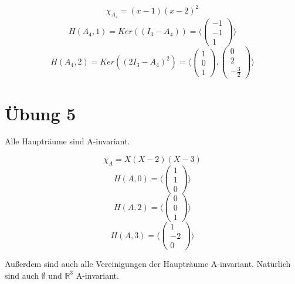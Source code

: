 \documentclass[10pt,a4paper]{article}
\begin{document}
\begin{equation}
\chi_{A_{4}} = (x - 1)(x - 2)^{2}
\end{equation}
\begin{equation}
H(A_{4}, 1) = Ker \left( (I_{3} - A_{4}) \right) = \langle
\begin{pmatrix}
-1\\-1\\1
\end{pmatrix}
\rangle
\end{equation}
\begin{equation}
H(A_{4}, 2) = Ker \left( (2I_{3} - A_{4})^{2} \right) = \langle
\begin{pmatrix}
1\\0\\1
\end{pmatrix},
\begin{pmatrix}
0\\2\\-\frac{3}{2}
\end{pmatrix}
\rangle
\end{equation}

\section*{Übung 5}

Alle Haupträume sind A-invariant.

\begin{equation}
\chi_{A} = X(X-2)(X-3)
\end{equation}
\begin{equation}
H(A,0) = \langle
\begin{pmatrix}
1\\1\\0
\end{pmatrix}
\rangle
\end{equation}
\begin{equation}
H(A,2) = \langle
\begin{pmatrix}
0\\0\\1
\end{pmatrix}
\rangle
\end{equation}
\begin{equation}
H(A,3) = \langle
\begin{pmatrix}
1\\-2\\0
\end{pmatrix}
\rangle
\end{equation}

Außerdem sind auch alle Vereinigungen der Haupträume A-invariant.
Natürlich sind auch $\emptyset$ und $\mathbb{R}^{3}$ A-invariant.
\end{document}

